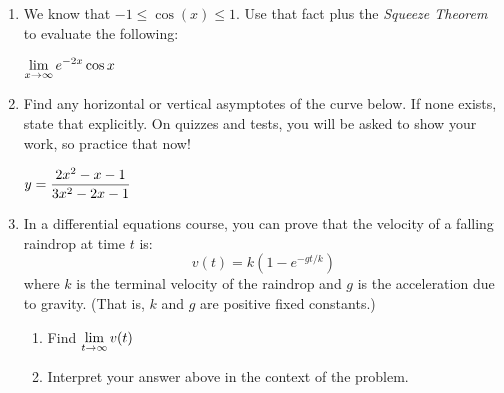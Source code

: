 \documentclass[11pt,fleqn]{article}
\newcommand{\be}{\begin{enumerate}}
\newcommand{\ee}{\end{enumerate}}
\begin{document}
\begin{enumerate}
     \vfill
     
     
  \item We know that $-1 \leq \cos(x) \leq 1$. Use that fact plus the \emph{Squeeze Theorem} to evaluate the following:
  
    $\displaystyle \lim_{x \to \infty} e^{-2x} \cos x$
    \vfill
 
 \item Find any horizontal or vertical asymptotes of the curve below. If none exists, state that explicitly. On quizzes and tests, you will be asked to show your work, so practice that now!
 
 $\displaystyle{y=\frac{2x^2-x-1}{3x^2-2x-1}}$   
 \vfill
 \item In a differential equations course, you can prove that the velocity of a falling raindrop at time $t$ is:
 $$v(t)=k(1-e^{-gt/k})$$
 where $k$ is the terminal velocity of the raindrop and $g$ is the acceleration due to gravity. (That is, $k$ and $g$ are positive fixed constants.)
 \begin{enumerate}
 \item Find $\displaystyle{\lim_{t \to \infty} v(t)}$
\vspace{.25in}
 \item Interpret your answer above in the context of the problem.
 \vspace{.25in}
 \end{enumerate}
    
%


\end{enumerate}
\end{document}
